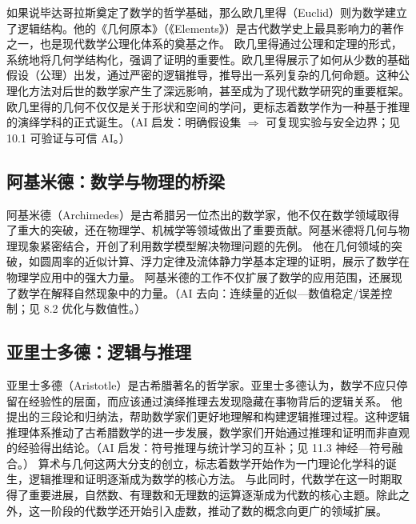 
如果说毕达哥拉斯奠定了数学的哲学基础，那么欧几里得（Euclid）则为数学建立了逻辑结构。他的《几何原本》（《Elements》）是古代数学史上最具影响力的著作之一，也是现代数学公理化体系的奠基之作。
欧几里得通过公理和定理的形式，系统地将几何学结构化，强调了证明的重要性。欧几里得展示了如何从少数的基础假设（公理）出发，通过严密的逻辑推导，推导出一系列复杂的几何命题。这种公理化方法对后世的数学家产生了深远影响，甚至成为了现代数学研究的重要框架。
欧几里得的几何不仅仅是关于形状和空间的学问，更标志着数学作为一种基于推理的演绎学科的正式诞生。{（AI 启发：明确假设集 $\Rightarrow$ 可复现实验与安全边界；见 10.1 可验证与可信 AI。）}
\subsection{阿基米德：数学与物理的桥梁}


阿基米德（Archimedes）是古希腊另一位杰出的数学家，他不仅在数学领域取得了重大的突破，还在物理学、机械学等领域做出了重要贡献。阿基米德将几何与物理现象紧密结合，开创了利用数学模型解决物理问题的先例。
他在几何领域的突破，如圆周率的近似计算、浮力定律及流体静力学基本定理的证明，展示了数学在物理学应用中的强大力量。
阿基米德的工作不仅扩展了数学的应用范围，还展现了数学在解释自然现象中的力量。{（AI 去向：连续量的近似—数值稳定/误差控制；见 8.2 优化与数值性。）}
\subsection{亚里士多德：逻辑与推理}


亚里士多德（Aristotle）是古希腊著名的哲学家。亚里士多德认为，数学不应只停留在经验性的层面，而应该通过演绎推理去发现隐藏在事物背后的逻辑关系。
他提出的三段论和归纳法，帮助数学家们更好地理解和构建逻辑推理过程。这种逻辑推理体系推动了古希腊数学的进一步发展，数学家们开始通过推理和证明而非直观的经验得出结论。{（AI 启发：符号推理与统计学习的互补；见 11.3 神经—符号融合。）}
算术与几何这两大分支的创立，标志着数学开始作为一门理论化学科的诞生，逻辑推理和证明逐渐成为数学的核心方法。
与此同时，代数学在这一时期取得了重要进展，自然数、有理数和无理数的运算逐渐成为代数的核心主题。除此之外，这一阶段的代数学还开始引入虚数，推动了数的概念向更广的领域扩展。

